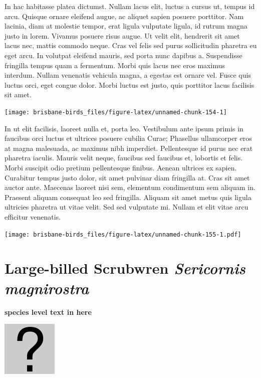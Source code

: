 \documentclass[]{book}
\let\origfigure\figure
\let\endorigfigure\endfigure
\renewenvironment{figure}[1][2] {
  \expandafter\origfigure\expandafter[H]
} {
  \endorigfigure
}
\begin{document}
In hac habitasse platea dictumst. Nullam lacus elit, luctus a cursus ut,
tempus id arcu. Quisque ornare eleifend augue, ac aliquet sapien posuere
porttitor. Nam lacinia, diam at molestie tempor, erat ligula vulputate
ligula, id rutrum magna justo in lorem. Vivamus posuere risus augue. Ut
velit elit, hendrerit sit amet lacus nec, mattis commodo neque. Cras vel
felis sed purus sollicitudin pharetra eu eget arcu. In volutpat eleifend
mauris, sed porta nunc dapibus a. Suspendisse fringilla tempus quam a
fermentum. Morbi quis lacus nec eros maximus interdum. Nullam venenatis
vehicula magna, a egestas est ornare vel. Fusce quis luctus orci, eget
congue dolor. Morbi luctus est justo, quis porttitor lacus facilisis sit
amet.

\begin{figure}
\texttt{[image: brisbane-birds\_files/figure-latex/unnamed-chunk-154-1]} \caption{insert figure caption}\label{fig:unnamed-chunk-154}
\end{figure}

In ut elit facilisis, laoreet nulla et, porta leo. Vestibulum ante ipsum
primis in faucibus orci luctus et ultrices posuere cubilia Curae;
Phasellus ullamcorper eros at magna malesuada, ac maximus nibh
imperdiet. Pellentesque id purus nec erat pharetra iaculis. Mauris velit
neque, faucibus sed faucibus et, lobortis et felis. Morbi suscipit odio
pretium pellentesque finibus. Aenean ultrices ex sapien. Curabitur
tempus justo dolor, sit amet pulvinar diam fringilla at. Cras sit amet
auctor ante. Maecenas laoreet nisi sem, elementum condimentum sem
aliquam in. Praesent aliquam consequat leo sed fringilla. Aliquam sit
amet metus quis ligula ultricies pharetra ut vitae velit. Sed sed
vulputate mi. Nullam et elit vitae arcu efficitur venenatis.

\begin{figure}
\centering
\texttt{[image: brisbane-birds\_files/figure-latex/unnamed-chunk-155-1.pdf]}
\caption{\label{fig:unnamed-chunk-155}insert figure caption}
\end{figure}

\section{\texorpdfstring{Large-billed Scrubwren \emph{Sericornis
magnirostra}}{Large-billed Scrubwren Sericornis magnirostra}}\label{large-billed-scrubwren-sericornis-magnirostra}

\textbf{species level text in here}

\begin{figure}
\centering
\includegraphics{assets/missing.png}
\caption{No image for species}
\end{figure}
\end{document}
